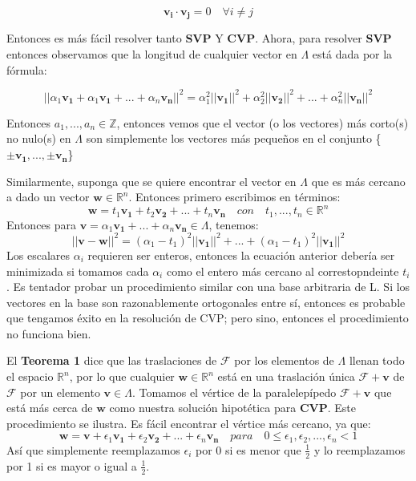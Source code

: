 \documentclass[12pt]{report}
\begin{document}
\[ \mathbf{v_{i}}\cdot \mathbf{v_{j}} = 0 \quad \forall i \neq j \]

Entonces es más fácil resolver tanto \textbf{SVP} Y \textbf{CVP}. Ahora, para resolver \textbf{SVP} entonces observamos que la longitud de cualquier vector en $\Lambda$ está dada por la fórmula:

\[ ||\alpha_{1}\mathbf{v_1} + \alpha_{1}\mathbf{v_1} + ... + \alpha_{n}\mathbf{v_n}||^{2} = \alpha_{1}^{2}||\mathbf{v_1}||^{2} + \alpha_{2}^{2}||\mathbf{v_2}||^{2} + ... + \alpha_{n}^{2}||\mathbf{v_n}||^{2} \]

Entonces $a_{1},...,a_{n} \in \mathbb{Z}$, entonces vemos que el vector (o los vectores) más corto(s) no nulo(s) en $\Lambda$ son simplemente los vectores más pequeños en el conjunto \{$ \pm \mathbf{v_1}, ..., \pm \mathbf{v_n}$\}

Similarmente, suponga que se quiere encontrar el vector en $\Lambda$ que es más cercano a dado un vector $\mathbf{w} \in \mathbb{R}^{n}$. Entonces primero escribimos en términos:
\[ \mathbf{w} = t_{1}\mathbf{v_1} + t_{2}\mathbf{v_2} + ... + t_{n}\mathbf{v_n} \quad con \quad t_{1},...,t_{n} \in \mathbb{R}^{n}\] 
Entonces para $\mathbf{v} = \alpha_{1}\mathbf{v_1} + ... + \alpha_{n}\mathbf{v_n} \in \Lambda$, tenemos: 
\[|| \mathbf{v} - \mathbf{w}||^{2} = (\alpha_{1} - t_{1})^{2}||\mathbf{v_{1}}||^{2} + ... + (\alpha_{1} - t_{1})^{2}||\mathbf{v_{1}}||^{2}  \]
Los escalares $\alpha_{i}$ requieren ser enteros, entonces la ecuación anterior debería ser minimizada si tomamos cada $\alpha_i$ como el entero más cercano al correstopndeinte $t_i$. Es tentador probar un procedimiento similar con una base arbitraria de L. Si los vectores en la base son razonablemente ortogonales entre sí, entonces es probable que tengamos éxito en la resolución de CVP; pero sino, entonces el procedimiento no funciona bien.

El \textbf{Teorema 1} dice que las traslaciones de $\mathcal{F}$ por los elementos de $\Lambda$ llenan todo el espacio $\mathbb{R}^{n}$, por lo que cualquier $\mathbf{w} \in \mathbb{R}^{n}$ está en una traslación única $\mathcal{F} + \mathbf{v}$ de $\mathcal{F}$ por un elemento $\mathbf{v} \in \Lambda$. Tomamos el vértice de la paralelepípedo $\mathcal{F} + \mathbf{v}$ que está más cerca de $\mathbf{w}$ como nuestra solución hipotética para \textbf{CVP}. Este procedimiento se ilustra. Es fácil encontrar el vértice más cercano, ya que:
 \[\mathbf{w} = \mathbf{v} + \epsilon_{1}\mathbf{v_1} + \epsilon_{2}\mathbf{v_2} + ... + \epsilon_{n}\mathbf{v_{n}} \quad para \quad 0 \leq \epsilon_{1}, \epsilon_{2}, ... , \epsilon_{n} < 1\]
 Así que simplemente reemplazamos $\epsilon_{i}$ por 0 si es menor que $\frac{1}{2}$ y lo reemplazamos por 1 si es mayor o igual a $\frac{1}{2}$.
\end{document}
